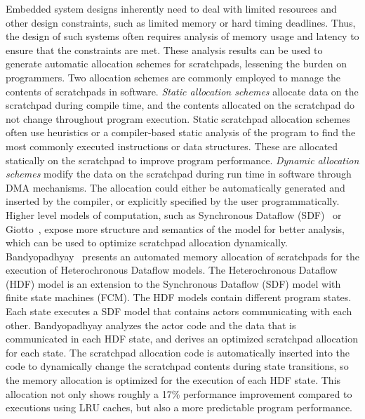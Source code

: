 Embedded system designs inherently need to deal with limited resources and other design constraints, such as limited memory or hard timing deadlines.    
Thus, the design of such systems often requires analysis of memory usage and latency to ensure that the constraints are met.
These analysis results can be used to generate automatic allocation schemes for scratchpads, lessening the burden on programmers.
Two allocation schemes are commonly employed to manage the contents of scratchpads in software.
\emph{Static allocation schemes} allocate data on the scratchpad during compile time, and the contents allocated on the scratchpad do not change throughout program execution. 
Static scratchpad allocation schemes~\cite{Suhendra2005WCETSPM, Patel2008PRETSPM} often use heuristics or a compiler-based static analysis of the program to find the most commonly executed instructions or data structures.
These are allocated statically on the scratchpad to improve program performance. 
\emph{Dynamic allocation schemes} modify the data on the scratchpad during run time in software through DMA mechanisms.
The allocation could either be automatically generated and inserted by the compiler, or explicitly specified by the user programmatically.
Higher level models of computation, such as Synchronous Dataflow (SDF)~\cite{lee_sdf} or Giotto~\cite{henzinger_giotto}, expose more structure and semantics of the model for better analysis, which can be used to optimize scratchpad allocation dynamically.
Bandyopadhyay~\cite{Bandyopadhyay06_AutomatedMemoryAllocationOfActorCodeDataBufferInHeterochronous} presents an automated memory allocation of scratchpads for the execution of Heterochronous Dataflow models.
The Heterochronous Dataflow (HDF) model is an extension to the Synchronous Dataflow (SDF) model with finite state machines (FCM). 
The HDF models contain different program states.
Each state executes a SDF model that contains actors communicating with each other. 
Bandyopadhyay analyzes the actor code and the data that is communicated in each HDF state, and derives an optimized scratchpad allocation for each state. 
The scratchpad allocation code is automatically inserted into the code to dynamically change the scratchpad contents during state transitions, so the memory allocation is optimized for the execution of each HDF state. 
This allocation not only shows roughly a 17\% performance improvement compared to executions using LRU caches, but also a more predictable program performance.

